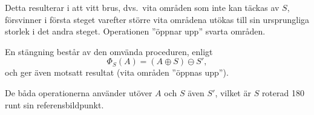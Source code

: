 \documentclass[../rapport_MVEX01-11-05]{subfiles}
\begin{document}
Detta resulterar i att vitt brus, dvs.~vita områden som inte kan täckas
av $S$, försvinner i
första steget varefter större vita områdena utökas till sin ursprungliga
storlek i det andra
steget. Operationen ''öppnar upp'' svarta områden.

En stängning består av den omvända proceduren, enligt
\begin{equation*}
  \Phi_S(A)=(A\oplus S)\ominus S',
\end{equation*}
och ger även motsatt resultat (vita områden ''öppnas upp'').

De
båda operationerna använder utöver $A$ och $S$ även $S'$, vilket är
$S$ roterad 180\textdegree{} runt sin referensbildpunkt.
\end{document}
